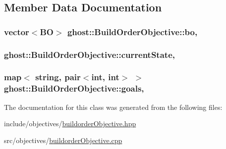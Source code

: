 \subsection{Member Data Documentation}
\hypertarget{classghost_1_1BuildOrderObjective_aa55dce8a8fbdc5fe64ddadfa715e968e}{
\subsubsection[{bo}]{\setlength{\rightskip}{0pt plus 5cm}vector$<${\bf B\-O}$>$ ghost\-::\-Build\-Order\-Objective\-::bo\hspace{0.3cm}{\ttfamily [mutable]}, {\ttfamily [protected]}}}\label{classghost_1_1BuildOrderObjective_aa55dce8a8fbdc5fe64ddadfa715e968e}
\hypertarget{classghost_1_1BuildOrderObjective_acb4b4b2c9dc0e99ab98e61289c62aff8}{
\subsubsection[{current\-State}]{ ghost\-::\-Build\-Order\-Objective\-::current\-State\hspace{0.3cm}{\ttfamily [mutable]}, {\ttfamily [protected]}}}\label{classghost_1_1BuildOrderObjective_acb4b4b2c9dc0e99ab98e61289c62aff8}
\hypertarget{classghost_1_1BuildOrderObjective_a714a7fc416d8925bc7d2b9026e9a212c}{
\subsubsection[{goals}]{\setlength{\rightskip}{0pt plus 5cm}map$<$ string, pair$<$int, int$>$ $>$ ghost\-::\-Build\-Order\-Objective\-::goals\hspace{0.3cm}{\ttfamily [mutable]}, {\ttfamily [protected]}}}\label{classghost_1_1BuildOrderObjective_a714a7fc416d8925bc7d2b9026e9a212c}


The documentation for this class was generated from the following files\-:\begin{DoxyCompactItemize}
\item 
include/objectives/\hyperlink{buildorderObjective_8hpp}{buildorder\-Objective.\-hpp}\item 
src/objectives/\hyperlink{buildorderObjective_8cpp}{buildorder\-Objective.\-cpp}\end{DoxyCompactItemize}
